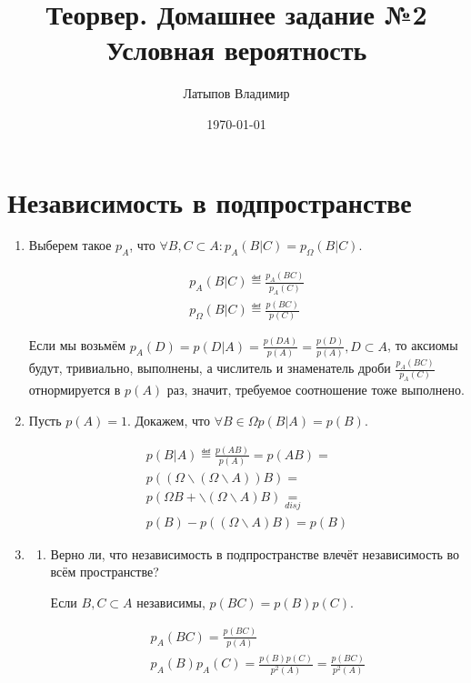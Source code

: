 \documentclass[12pt, a4paper]{article}
\title{Теорвер. Домашнее задание №2 \\ \large Условная вероятность}
\author{
  Латыпов Владимир
}
\date{\today}
\begin{document}
\maketitle

\section{Независимость в подпространстве}

\begin{enumerate}
    \item Выберем такое $p_A$, что $\forall B, C \subset A: p_A(B | C) = p_\Omega(B | C)$.
    
    \begin{gather}
        p_A(B | C) \eqdef \frac{p_A(BC)}{p_A(C)} \\
        p_\Omega(B | C) \eqdef \frac{p(BC)}{p(C)}
    \end{gather}

    Если мы возьмём $p_A(D) = p(D | A) = \frac{p(DA)}{p(A)} = \frac{p(D)}{p(A)}, D \subset A$, 
    то аксиомы будут, тривиально, выполнены,
    а числитель и знаменатель дроби $\frac{p_A(BC)}{p_A(C)}$ отнормируется в $p(A)$ раз, 
    значит, требуемое соотношение тоже выполнено.

    \item Пусть $p(A) = 1$. Докажем, что $\forall B \in \Omega p(B | A) = p(B)$.
    
    \begin{multline}
        p(B | A) \eqdef \frac{p(AB)}{p(A)} = p(AB) = \\
        p((\Omega \backslash (\Omega \backslash A))B) = \\
        p(\Omega B + \backslash (\Omega \backslash A) B) \underset{disj} = \\
        p(B) - p((\Omega \backslash A) B) = p(B)
    \end{multline}

    \item \begin{enumerate}
        \item Верно ли, что независимость в подпространстве 
        влечёт независимость во всём пространстве?
        
        Если $B, C \subset A$ независимы, $p(BC) = p(B) p(C)$. 

        \begin{gather}
            p_A(BC) = \frac{p(BC)}{p(A)} \\
            p_A(B)p_A(C) = \frac{p(B)p(C)}{p^2(A)} = \frac{p(BC)}{p^2(A)}
        \end{gather}
        

\end{enumerate}
\end{enumerate}
\end{document}
